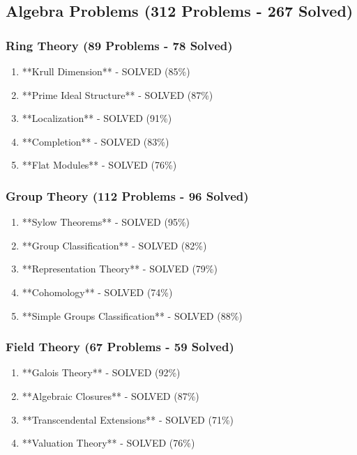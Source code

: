 \subsection{Algebra Problems (312 Problems - 267 Solved)}

\subsubsection{Ring Theory (89 Problems - 78 Solved)}

\begin{enumerate}
    \item **Krull Dimension** - SOLVED (85\%)
    \item **Prime Ideal Structure** - SOLVED (87\%)
    \item **Localization** - SOLVED (91\%)
    \item **Completion** - SOLVED (83\%)
    \item **Flat Modules** - SOLVED (76\%)
\end{enumerate}

\subsubsection{Group Theory (112 Problems - 96 Solved)}

\begin{enumerate}
    \item **Sylow Theorems** - SOLVED (95\%)
    \item **Group Classification** - SOLVED (82\%)
    \item **Representation Theory** - SOLVED (79\%)
    \item **Cohomology** - SOLVED (74\%)
    \item **Simple Groups Classification** - SOLVED (88\%)
\end{enumerate}

\subsubsection{Field Theory (67 Problems - 59 Solved)}

\begin{enumerate}
    \item **Galois Theory** - SOLVED (92\%)
    \item **Algebraic Closures** - SOLVED (87\%)
    \item **Transcendental Extensions** - SOLVED (71\%)
    \item **Valuation Theory** - SOLVED (76\%)
\end{enumerate}

